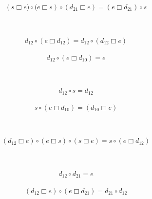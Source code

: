 \documentclass[runningheads,a4paper]{llncs}
\newcommand{\bx}{\mathbin{\Box}}
\newcommand{\qq}{\qquad}
\begin{document}
\begin{minipage}[r]{300pt}
\begin{align}\label{E:9}
\left(
s \bx e )\circ ( e \bx s \right)\circ\left( d_{21}\bx e
\right)= \left( e\bx d_{21}\right)\circ s
\end{align}
\end{minipage}\\
\begin{minipage}[b]{170pt}
\begin{align}\label{E:10}   d_{12}\circ \left(  e\bx d_{12} \right)=d_{12}\circ
\left( d_{12}\bx e \right)\end{align}  \end{minipage} \qq  \begin{minipage}[b]{140pt}\begin{align}\label{E:11}   d_{12}\circ \left( e\bx
d_{10} \right)=e
\end{align}
\end{minipage}\\
\begin{minipage}[b]{120pt}
\begin{align}\label{E:12}
 d_{12}\circ s =d_{12} \end{align}  \end{minipage} \qq  \begin{minipage}[b]{180pt}\begin{align}\label{E:13}   s\circ \left(
e\bx d_{10} \right)= \left( d_{10}\bx e \right)
\end{align}
\end{minipage}\\
\begin{minipage}[b]{300pt}
\begin{align}\label{E:14}
 \left( d_{12}\bx e \right)\circ (  e \bx s )\circ (s \bx
e) = s\circ \left( e\bx d_{12} \right)
\end{align}
\end{minipage}\\
\begin{minipage}[b]{100pt}
\begin{align}\label{E:15}
 d_{12}\circ d_{21}=e \end{align}  \end{minipage} \qq\quad  \begin{minipage}[b]{200pt}\begin{align}\label{E:16} \left( d_{12}\bx e
\right)\circ \left(e\bx d_{21} \right)= d_{21}\circ d_{12}
\end{align}
\end{minipage}\\
\end{document}
